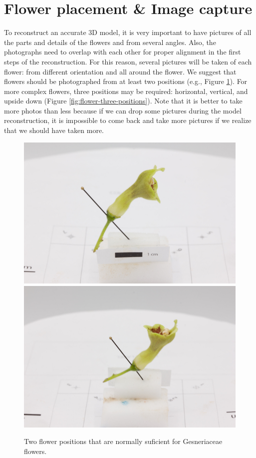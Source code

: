 \documentclass[
]{book}
\begin{document}
\hypertarget{flower-placement-image-capture}{%
\section{Flower placement \& Image capture}\label{flower-placement-image-capture}}

To reconstruct an accurate 3D model, it is very important to have
pictures of all the parts and details of the flowers and from several
angles. Also, the photographs need to overlap with each other for proper
alignment in the first steps of the reconstruction. For this reason,
several pictures will be taken of each flower: from different
orientation and all around the flower. We suggest that flowers should be
photographed from at least two positions (e.g., Figure \ref{fig:flower-two-positions}). For more complex flowers, three positions may be required: horizontal, vertical, and upside down (Figure
\ref{fig:flower-three-positions}). Note that it is better to take
more photos than less because if we can drop some pictures during the
model reconstruction, it is impossible to come back and take more
pictures if we realize that we should have taken more.

\begin{figure}

{\centering \includegraphics[width=0.33\linewidth]{Figures/position_2} \includegraphics[width=0.33\linewidth]{Figures/position_5} 

}

\caption{Two flower positions that are normally suficient for Gesneriaceae flowers.}\label{fig:flower-two-positions}
\end{figure}
\end{document}
